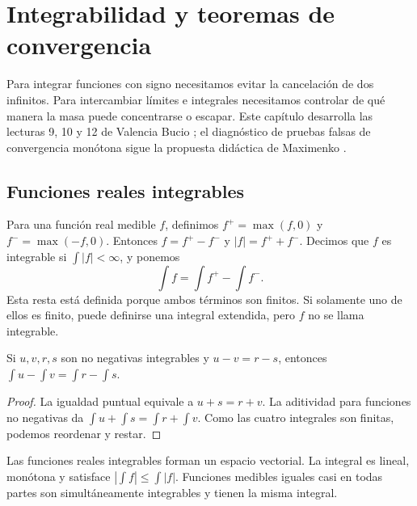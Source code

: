 \chapter{Integrabilidad y teoremas de convergencia}\label{cap:v2-05}
Para integrar funciones con signo necesitamos evitar la cancelación de dos infinitos. Para intercambiar límites e integrales necesitamos controlar de qué manera la masa puede concentrarse o escapar. Este capítulo desarrolla las lecturas 9, 10 y 12 de Valencia Bucio \cite{valencia2}; el diagnóstico de pruebas falsas de convergencia monótona sigue la propuesta didáctica de Maximenko \cite{maximenkoFalsas}.

\section{Funciones reales integrables}\label{lectura:v2-09}
\begin{definicion}
Para una función real medible $f$, definimos $f^+=\max(f,0)$ y $f^-=\max(-f,0)$. Entonces $f=f^+-f^-$ y $|f|=f^++f^-$. Decimos que $f$ es integrable si $\int|f|<\infty$, y ponemos
\[\int f=\int f^+-\int f^-.\]
Esta resta está definida porque ambos términos son finitos. Si solamente uno de ellos es finito, puede definirse una integral extendida, pero $f$ no se llama integrable.
\end{definicion}
\begin{lema}\label{lema:v2-descomposicion-integral}
Si $u,v,r,s$ son no negativas integrables y $u-v=r-s$, entonces $\int u-\int v=\int r-\int s$.
\end{lema}
\begin{proof}
La igualdad puntual equivale a $u+s=r+v$. La aditividad para funciones no negativas da $\int u+\int s=\int r+\int v$. Como las cuatro integrales son finitas, podemos reordenar y restar.
\end{proof}
\begin{teorema}\label{teo:v2-integral-lineal}
Las funciones reales integrables forman un espacio vectorial. La integral es lineal, monótona y satisface $|\int f|\le\int|f|$. Funciones medibles iguales casi en todas partes son simultáneamente integrables y tienen la misma integral.
\end{teorema}
